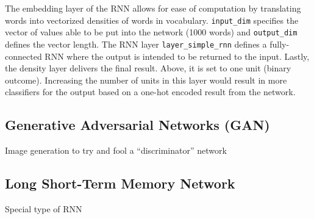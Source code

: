 The embedding layer of the RNN allows for ease of computation by
translating words into vectorized densities of words in vocabulary.
\texttt{input\_dim} specifies the vector of values able to be put into
the network (1000 words) and \texttt{output\_dim} defines the vector
length. The RNN layer \texttt{layer\_simple\_rnn} defines a
fully-connected RNN where the output is intended to be returned to the
input. Lastly, the density layer delivers the final result. Above, it is
set to one unit (binary outcome). Increasing the number of units in this
layer would result in more classifiers for the output based on a one-hot
encoded result from the network.

\hypertarget{generative-adversarial-networks-gan}{%
\subsection{Generative Adversarial Networks
(GAN)}\label{generative-adversarial-networks-gan}}

Image generation to try and fool a ``discriminator'' network

\hypertarget{long-short-term-memory-network}{%
\subsection{Long Short-Term Memory
Network}\label{long-short-term-memory-network}}

Special type of RNN \cite{Rai}

